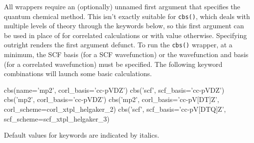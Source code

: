 
All wrappers require an (optionally) unnamed first argument 
that specifies the quantum chemical method. This isn't exactly suitable for \texttt{cbs()},
which deals with multiple levels of theory through the  keywords
below, so this first argument can be used in place of  for
correlated calculations or with value  otherwise. Specifying
 outright renders the first argument defunct. To run the
\texttt{cbs()} wrapper, at a minimum, the SCF basis (for a SCF wavefunction) or the wavefunction
and basis (for a correlated wavefunction) must be specified.
The following keyword combinations will launch some basic calculations.
\begin{Snippet}
cbs(name='mp2', corl_basis='cc-pVDZ')
cbs('scf', scf_basis='cc-pVDZ')
cbs('mp2', corl_basis='cc-pVDZ')
cbs('mp2', corl_basis='cc-pV[DT]Z', corl_scheme=corl_xtpl_helgaker_2)
cbs('scf', scf_basis='cc-pV[DTQ]Z', scf_scheme=scf_xtpl_helgaker_3)
\end{Snippet}


Default values for keywords are indicated by italics.

